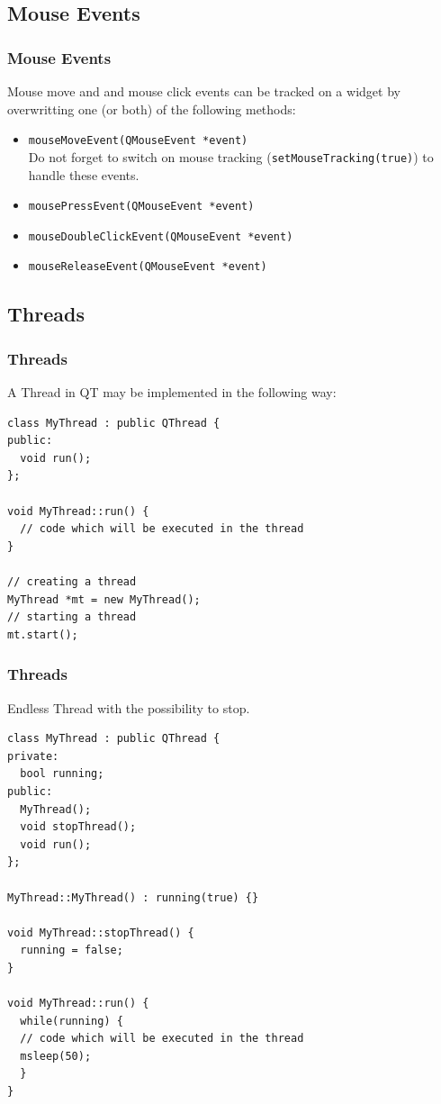 \subsection{Mouse Events}
\begin{frame}[fragile]
\frametitle{Mouse Events}
Mouse move and and mouse click events can be tracked on a widget by
overwritting one (or both) of the following methods:

\begin{itemize}
\item \verb|mouseMoveEvent(QMouseEvent *event)|\\
Do not forget to switch on mouse tracking (\verb|setMouseTracking(true)|) to handle these events.
\item \verb|mousePressEvent(QMouseEvent *event)|
\item \verb|mouseDoubleClickEvent(QMouseEvent *event)|
\item \verb|mouseReleaseEvent(QMouseEvent *event)|
\end{itemize}

\end{frame}

\subsection{Threads}
\begin{frame}[fragile]
\frametitle{Threads}
A Thread in QT may be implemented in the following way:
{\tiny
\begin{lstlisting}
class MyThread : public QThread {
public:
  void run();
};

void MyThread::run() {
  // code which will be executed in the thread
}

// creating a thread
MyThread *mt = new MyThread();
// starting a thread
mt.start();
\end{lstlisting}
}
\end{frame}

\begin{frame}[fragile]
\frametitle{Threads}
Endless Thread with the possibility to stop.
{\tiny
\begin{lstlisting}
class MyThread : public QThread {
private:
  bool running;
public:
  MyThread();
  void stopThread();
  void run();
};

MyThread::MyThread() : running(true) {}

void MyThread::stopThread() {
  running = false;
}

void MyThread::run() {
  while(running) {
  // code which will be executed in the thread
  msleep(50);
  }
}
\end{lstlisting}
}
\end{frame}

